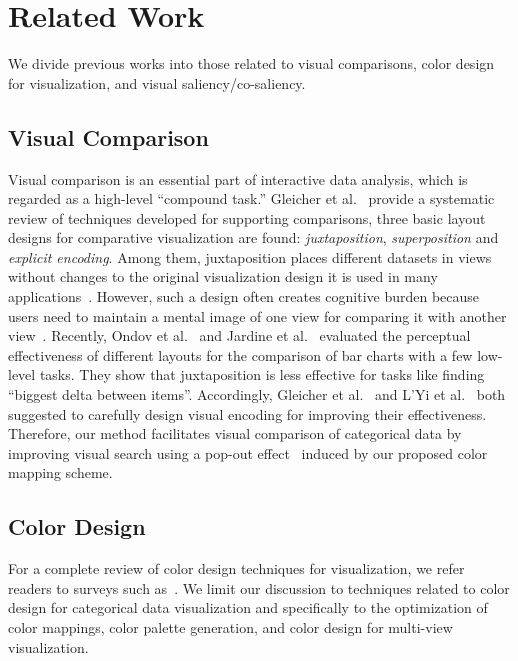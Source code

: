 \section {Related Work}
We divide previous works into those related to visual comparisons, color design for visualization, and visual saliency/co-saliency.


\subsection{Visual Comparison}
Visual comparison is an essential part of interactive data analysis, which is regarded as a high-level ``compound task.'' Gleicher et al.~\cite{Gleicher11} provide a systematic review of techniques developed for supporting comparisons, three basic layout designs for comparative visualization are found: \emph{juxtaposition}, \emph{superposition} and \emph{explicit encoding}. Among them, juxtaposition places different datasets in  
views without changes to the original visualization design  it is used in many applications~\cite{munzner2003treejuxtaposer,Albers11,Lobo15}. However, such a design often creates cognitive burden because users need to maintain a mental image of one view for comparing it with another view~\cite{LYi21}. Recently, Ondov et al.~\cite{Ondov19} and Jardine et al.~\cite{jardine2019perceptual} evaluated the perceptual effectiveness of different layouts for the comparison of bar charts with a few low-level tasks. They show that juxtaposition is less effective for tasks like finding ``biggest delta between items''.
Accordingly, Gleicher et al.~\cite{Gleicher11} and  L'Yi et al.~\cite{LYi21} both suggested to carefully design visual encoding for improving their effectiveness. Therefore, our method facilitates visual comparison of categorical data by improving visual search using a pop-out effect~\cite{enns1990three} induced by our proposed color mapping scheme.

\subsection{Color Design}
For a complete review of color design techniques for visualization, we refer readers to surveys such as~\cite{Tominski08,Zhou16}. We limit our discussion to techniques related to color design for categorical data visualization and specifically to the optimization of color mappings, color palette generation, and color design for multi-view visualization.

